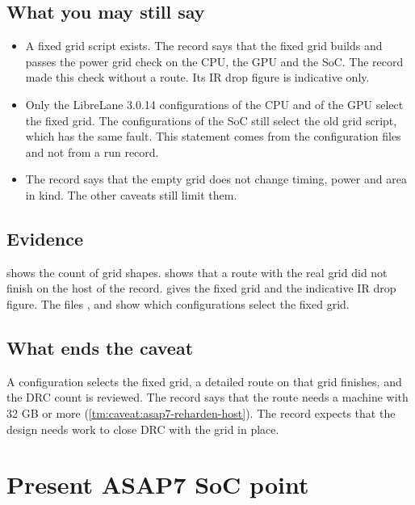 \subsection*{What you may still say}
\begin{itemize}
  \item A fixed grid script exists. The record says that the fixed grid builds and passes the power grid check on the CPU, the GPU and the SoC. The record made this check without a route. Its IR drop figure is indicative only.
  \item Only the LibreLane 3.0.14 configurations of the CPU and of the GPU select the fixed grid. The configurations of the SoC still select the old grid script, which has the same fault. This statement comes from the configuration files and not from a run record.
  \item The record says that the empty grid does not change timing, power and area in kind. The other caveats still limit them.
\end{itemize}

\subsection*{Evidence}
 shows the count of grid shapes.  shows that a route with the real grid did not finish on the host of the record.  gives the fixed grid and the indicative IR drop figure. The files ,  and  show which configurations select the fixed grid.

\subsection*{What ends the caveat}
A configuration selects the fixed grid, a detailed route on that grid finishes, and the DRC count is reviewed. The record says that the route needs a machine with 32 GB or more (\cref{tm:caveat:asap7-reharden-host}). The record expects that the design needs work to close DRC with the grid in place.

\section{Present ASAP7 SoC point}\label{tm:caveat:asap7-soc-setup-wns}
